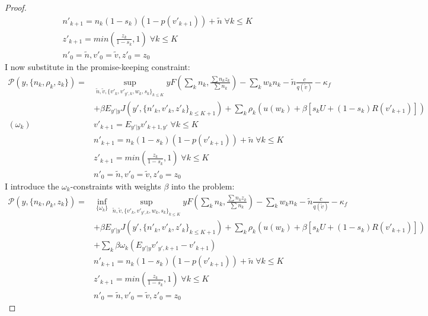\begin{proof}
\begin{equation*}
\begin{split}
    & n'_{k+1} = n_k(1-s_k)(1-p(v'_{k+1}))+\tilde{n}\; \forall k\leq K \\
    & z'_{k+1} = min(\frac{z_k}{1-s_k},1)\; \forall k\leq K \\
    & n'_0 = \tilde{n}, v'_0 = \tilde{v}, z'_0 = z_0
    \end{split}
\end{equation*}
I now substitute in the promise-keeping constraint:
\begin{equation*}
    \begin{split}
 \mathcal{P}(y,\{n_k,\rho_k,z_k\}) =
    & \sup_{\tilde{n},\tilde{v},\{v'_k,v'_{y',k},w_{k},s_{k}\}_{k\leq K}} 
    yF(\sum_k n_k,\frac{\sum n_kz_k}{\sum n_k})-
    \sum_k w_kn_k
    -\tilde{n}\frac{c}{q(\tilde{v})}-\kappa_f \\
    & +\beta E_{y'|y} J(y',\{n'_k,v'_k,z'_k\}_{k\leq K+1}) + \sum_k \rho_k (u(w_k) + \beta [s_k U + (1-s_k)R(v'_{k+1})])  \\
(\omega_k) \:    & v'_{k+1} = E_{y'|y} v'_{k+1,y'} \; \forall k\leq K \\
    & n'_{k+1} = n_k(1-s_k)(1-p(v'_{k+1}))+\tilde{n}\; \forall k\leq K \\
    & z'_{k+1} = min(\frac{z_k}{1-s_k},1)\; \forall k\leq K \\
    & n'_0 = \tilde{n}, v'_0 = \tilde{v}, z'_0 = z_0
    \end{split}
\end{equation*}
I introduce the $\omega_k$-constraints with weights $\beta$ into the problem:
\begin{equation*}
    \begin{split}
 \mathcal{P}(y,\{n_k,\rho_k,z_k\}) =
    & \inf_{\{\omega_k\}}\sup_{\tilde{n},\tilde{v},\{v'_k,v'_{y',k},w_{k},s_{k}\}_{k\leq K}} 
    yF(\sum_k n_k,\frac{\sum n_kz_k}{\sum n_k})-
    \sum_k w_kn_k
    -\tilde{n}\frac{c}{q(\tilde{v})}-\kappa_f \\
    & +\beta E_{y'|y} J(y',\{n'_k,v'_k,z'_k\}_{k\leq K+1}) + \sum_k \rho_k (u(w_k) + \beta [s_k U + (1-s_k)R(v'_{k+1})])  \\
    & + \sum_k \beta\omega_k(E_{y'|y}v'_{y',k+1}-v'_{k+1})\\
    & n'_{k+1} = n_k(1-s_k)(1-p(v'_{k+1}))+\tilde{n}\; \forall k\leq K \\
    & z'_{k+1} = min(\frac{z_k}{1-s_k},1)\; \forall k\leq K \\
    & n'_0 = \tilde{n}, v'_0 = \tilde{v}, z'_0 = z_0

\end{split}
\end{equation*}
\end{proof}
